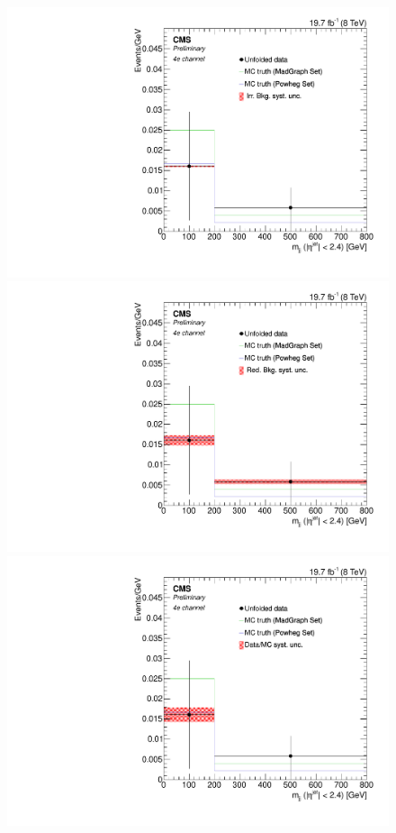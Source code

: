 \begin{figure}[hbtp]
\begin{center}
    \includegraphics[width=0.8\cmsFigWidth]{Figures/Unfolding/Systematics/ZZTo4e_CentralMjj_IrrBkg_Mad_fr}
    \includegraphics[width=0.8\cmsFigWidth]{Figures/Unfolding/Systematics/ZZTo4e_CentralMjj_RedBkg_Mad_fr}     
    \includegraphics[width=0.8\cmsFigWidth]{Figures/Unfolding/Systematics/ZZTo4e_CentralMjj_UnfDataOverGenMC_Mad_fr}     

\end{center}
\end{figure}
